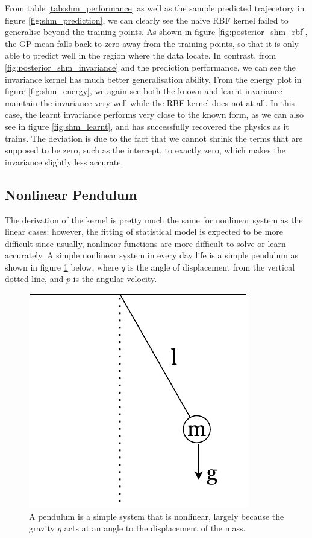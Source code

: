 \documentclass{statsmsc}
\begin{document}
From table \ref{tab:shm_performance} as well as the sample predicted trajecetory in figure \ref{fig:shm_prediction}, we can clearly see the naive RBF kernel failed to generalise beyond the training points. 
As shown in figure \ref{fig:posterior_shm_rbf}, the GP mean falls back to zero away from the training points, so that it is only able to predict well in the region where the data locate. 
In contrast, from \ref{fig:posterior_shm_invariance} and the prediction performance, we can see the invariance kernel has much better generalisation ability.
From the energy plot in figure \ref{fig:shm_energy}, we again see both the known and learnt invariance maintain the invariance very well while the RBF kernel does not at all.
In this case, the learnt invariance performs very close to the known form, as we can also see in figure \ref{fig:shm_learnt}, and has successfully recovered the physics as it trains. 
The deviation is due to the fact that we cannot shrink the terms that are supposed to be zero, such as the intercept, to exactly zero, which makes the invariance slightly less accurate.


\subsection{Nonlinear Pendulum}
The derivation of the kernel is pretty much the same for nonlinear system as the linear cases; 
however, the fitting of statistical model is expected to be more difficult since usually, nonlinear functions are more difficult to solve or learn accurately.
A simple nonlinear system in every day life is a simple pendulum as shown in figure \ref{fig:pendulum_diagram} below, where $q$ is the angle of displacement from the vertical dotted line, and $p$ is the angular velocity.

\begin{figure}[H]
        \centering
        \includegraphics[width=0.3\linewidth]{../figures/pendulum.pdf}
        \caption{A pendulum is a simple system that is nonlinear, largely because the gravity $g$ acts at an angle to the displacement of the mass.}
        \label{fig:pendulum_diagram}
\end{figure}
\end{document}

